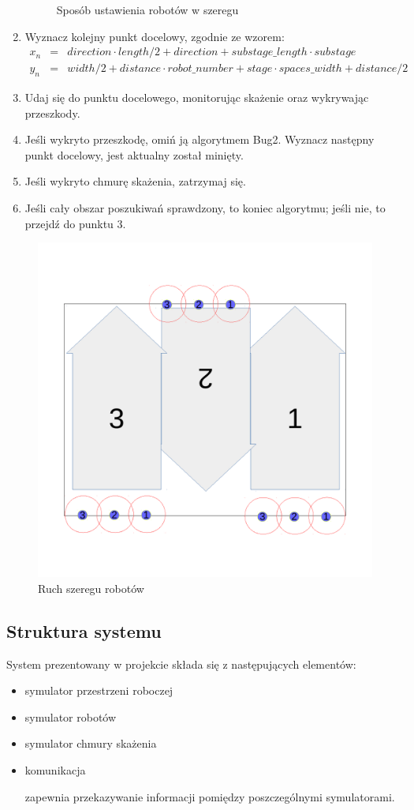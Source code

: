 \documentclass[a4paper, 12pt]{article}
\begin{document}
\begin{enumerate}
\begin{figure}[h!]
			\caption{Sposób ustawienia robotów w szeregu}
			\label{odleglosci}
		\end{figure}
		\item Wyznacz kolejny punkt docelowy, zgodnie ze wzorem:
		\begin{eqnarray}
		x_n &=& direction \cdot length / 2 + direction + substage\_length \cdot substage\\
		y_n &=& width / 2 + distance \cdot robot\_number + stage \cdot spaces\_width + distance / 2
		\end{eqnarray}
		\item Udaj się do punktu docelowego, monitorując skażenie oraz wykrywając przeszkody.
		\item Jeśli wykryto przeszkodę, omiń ją algorytmem Bug2. Wyznacz następny punkt docelowy, jest aktualny został minięty.
		\item Jeśli wykryto chmurę skażenia, zatrzymaj się.
		\item Jeśli cały obszar poszukiwań sprawdzony, to koniec algorytmu; jeśli nie, to przejdź do punktu 3.
		\end{enumerate}
		\begin{figure}[h!]
			\centering
			\includegraphics*[width=0.7\columnwidth]{img/ruch.pdf}
			\caption{Ruch szeregu robotów}
			\label{ruch}
		\end{figure}
		
	
	\subsection{Struktura systemu}
	System prezentowany w projekcie składa się z następujących elementów:
	\begin{itemize}
	\item symulator przestrzeni roboczej	
	\item symulator robotów
	\item symulator chmury skażenia	
	\item komunikacja
	
	zapewnia przekazywanie informacji pomiędzy poszczególnymi symulatorami.
	\end{itemize}
	
\end{document}
